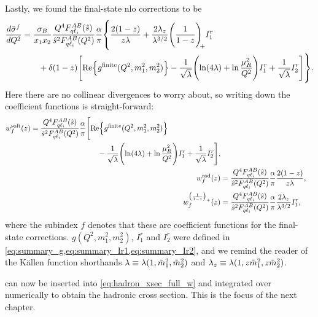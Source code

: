 Lastly, we found the final-state \gls{nlo} corrections to be
\begin{equation}
    \begin{split}
        \frac{d\hat\sigma^f}{dQ^2} &= \frac{\sigma_B}{x_1 x_2} \frac{Q^4 \fqliab(\shat)}{\shat^2 \fqliab(Q^2)} \frac{\alpha}{\pi} \vastl\{
            \frac{2(1-z)}{z\lambda}
            + \frac{2\lambda_z}{\lambda^{3/2}} \plusdist I^r_1
            \\ &\qquad
            + \delta(1-z) \Biggl[
                \Re\Bigl\{ g^{\mathrm{finite}}(Q^2,m_1^2,m_2^2) \Bigr\}
                - \frac{1}{\sqrt{\lambda}} \Biggl(
                    \ln(4\lambda)
                    + \ln\frac{\mu_R^2}{Q^2}
                \Biggr) I^r_1
                + \frac{1}{\sqrt{\lambda}} I^r_2
            \Biggr]
        \vastr\}.
    \end{split}
\end{equation}
Here there are no collinear divergences to worry about, so writing down the coefficient functions is straight-forward:
\begin{subequations}
\label{eq:hadron_w_final_state}
\begin{align}
    \begin{split}
        w^{\text{soft}}_f(z) &= \frac{Q^4 F_{q\ell_i}^{AB}(\hat{s})}{\hat{s}^2 F_{q\ell_i}^{AB}(Q^2)} \frac{\alpha}{\pi} \Biggl[
            \operatorname{Re}\Bigl\{ g^{\mathrm{finite}}(Q^2,m_1^2,m_2^2) \Bigr\}
            \\ &\hspace{9em}
            - \frac{1}{\sqrt{\lambda}} \Biggl(
                \ln(4\lambda)
                + \ln\frac{\mu_R^2}{Q^2}
            \Biggr) I^r_1
            + \frac{1}{\sqrt{\lambda}} I^r_2
        \Biggr],
    \end{split}
    \\
    w^{\text{rad}}_f(z) &= \frac{Q^4 F_{q\ell_i}^{AB}(\hat{s})}{\hat{s}^2 F_{q\ell_i}^{AB}(Q^2)} \frac{\alpha}{\pi} \frac{2(1-z)}{z\lambda},
    \\
    w^{\bigl(\frac{1}{1-z}\bigr)_+}_f(z) &= \frac{Q^4 F_{q\ell_i}^{AB}(\hat{s})}{\hat{s}^2 F_{q\ell_i}^{AB}(Q^2)} \frac{\alpha}{\pi} \frac{2\lambda_z}{\lambda^{3/2}} I^r_1,
\end{align}
\end{subequations}
where the subindex $f$ denotes that these are coefficient functions for the final-state corrections.
$g(Q^2,m_1^2,m_2^2)$, $I_1^r$ and $I_2^r$ were defined in \cref{eq:summary_g,eq:summary_Ir1,eq:summary_Ir2}, and we remind the reader of the K\"allen function shorthands $\lambda \equiv \lambda(1,\tilde{m}_1^2,\tilde{m}_2^2)$ and $\lambda_z \equiv \lambda(1,z\tilde{m}_1^2,z\tilde{m}_2^2)$.

 can now be inserted into \cref{eq:hadron_xsec_full_w} and integrated over numerically to obtain the hadronic cross section.
This is the focus of the next chapter.